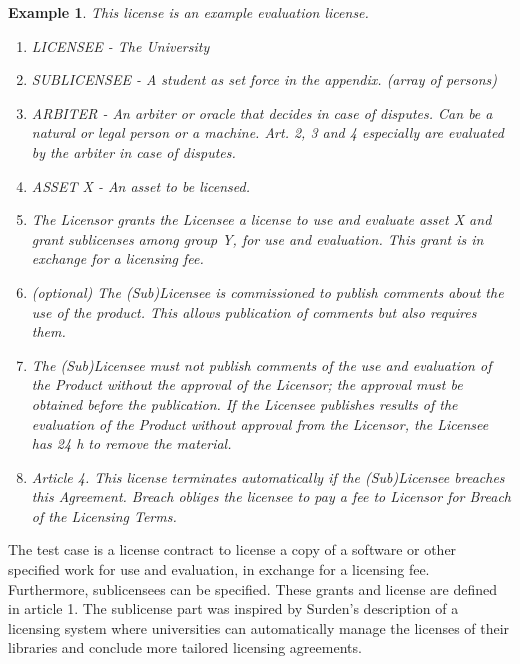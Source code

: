 \documentclass[conference]{IEEEtran}
\newtheorem{example}{Example}
\begin{document}
%
\begin{example}\label{ex:license_example}
This license is an example evaluation license.

\begin{enumerate}[label={Article \arabic*.},leftmargin=*]

\item[] LICENSEE - The University
\item[] SUBLICENSEE - A student as set force in the appendix. (array of persons)
\item[] ARBITER - An arbiter or oracle that decides in case of disputes. Can be a natural or legal person or a machine. Art. 2, 3 and 4 especially are evaluated by the arbiter in case of disputes.
\item[] ASSET X - An asset to be licensed.
\item The Licensor grants the Licensee a license to use and evaluate asset X and grant sublicenses among group Y, for use and evaluation. This grant is in exchange for a licensing fee.
\item (optional) The (Sub)Licensee is commissioned to publish comments about the use of the product. This allows publication of comments but also requires them.
\item The (Sub)Licensee must not publish comments of the use and evaluation  of the Product without the approval of the Licensor; the approval must be obtained before the publication. If the Licensee publishes results of the evaluation of the Product without approval from the Licensor, the Licensee has 24 h to remove the material.
\item Article 4.  This license terminates automatically if the (Sub)Licensee breaches this Agreement. Breach obliges the licensee to pay a fee to Licensor for Breach of the Licensing Terms.
\end{enumerate}
\end{example}
The test case is a license contract to license a copy of a software or other specified work for use and evaluation, in exchange for a licensing fee. Furthermore, sublicensees can be specified. These grants and license are defined in article 1. The sublicense part was inspired by Surden’s  description of a licensing system where universities can automatically manage the licenses of their libraries and conclude more tailored licensing agreements. %
\end{document}
